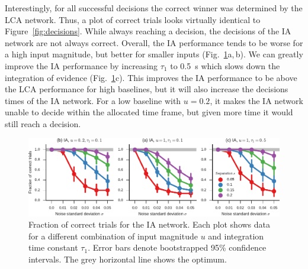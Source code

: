 \documentclass[10pt,letterpaper]{article}
\begin{document}
Interestingly, for all successful decisions the correct winner was determined by the LCA network.
Thus, a plot of correct trials looks virtually identical to Figure~\ref{fig:decisions}.
While always reaching a decision, the decisions of the IA network are not always correct.
Overall, the IA performance tends to be worse for a high input magnitude, but better for smaller inputs (Fig.~\ref{fig:correct}a,\,b).
We can greatly improve the IA performance by increasing $\tau_1$ to \SI{0.5}{\second} which slows down the integration of evidence (Fig.~\ref{fig:correct}c).
This improves the IA performance to be above the LCA performance for high baselines, but it will also increase the decisions times of the IA network.
For a low baseline with $u=0.2$, it makes the IA network unable to decide within the allocated time frame, but given more time it would still reach a decision.
\begin{figure}[t]
    \centering
    \includegraphics{figures/correct}
    \caption{
        Fraction of correct trials for the IA network.
        Each plot shows data for a different combination of input magnitude $u$ and integration time constant $\tau_1$.
        Error bars denote bootstrapped 95\% confidence intervals.
        The grey horizontal line shows the optimum.
    }\label{fig:correct}
\end{figure}
\end{document}
